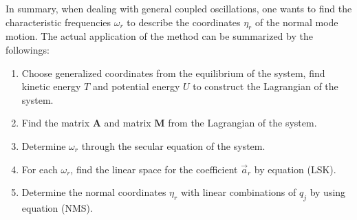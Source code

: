 \documentclass[11pt,oneside]{book}
\theoremstyle{break}
\theoremstyle{break}
\begin{document}
In summary, when dealing with general coupled oscillations, one wants to find the characteristic frequencies $\omega_r$ to describe the coordinates $\eta_r$ of the normal mode motion. The actual application of the method can be summarized by the followings:
\begin{enumerate}
\item Choose generalized coordinates from the equilibrium of the system, find kinetic energy $T$ and potential energy $U$ to construct the Lagrangian of the system.
\item Find the matrix $\mathbf{A}$ and matrix $\mathbf{M}$ from the Lagrangian of the system.
\item Determine $\omega_r$ through the secular equation of the system.
\item For each $\omega_r$, find the linear space for the coefficient $\vec{a}_r$ by equation (LSK).
\item Determine the normal coordinates $\eta_r$ with linear combinations of $q_j$ by using equation (NMS). 
\end{enumerate}
\end{document}
